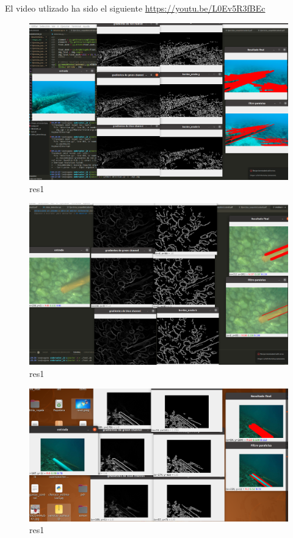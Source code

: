 \documentclass[12pt, a4paper]{article}
\begin{document}
El video utlizado ha sido el siguiente \href{https://youtu.be/L0Ev5R3fBEc}{https://youtu.be/L0Ev5R3fBEc}

\newpage
\begin{figure}[H]
    \includegraphics[scale=0.22]{images_doc/img1_results.png}
    \caption{res1}\label{fig:im1r}
\end{figure}

\newpage
\begin{figure}[H]
    \includegraphics[scale=0.22]{images_doc/img2_results.png}
    \caption{res1}\label{fig:im2r}
\end{figure}
\newpage
\begin{figure}[H]
    \includegraphics[scale=0.22]{images_doc/img3_results.png}
    \caption{res1}\label{fig:im3r}
\end{figure}
\end{document}
